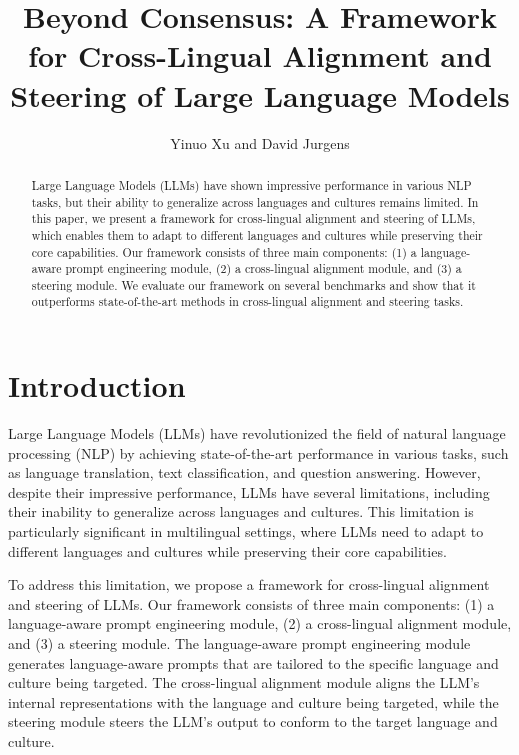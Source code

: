 \documentclass{article}
\begin{document}
\title{Beyond Consensus: A Framework for Cross-Lingual Alignment and Steering of Large Language Models}

\author{Yinuo Xu and David Jurgens}

\maketitle

\begin{abstract}
Large Language Models (LLMs) have shown impressive performance in various NLP tasks, but their ability to generalize across languages and cultures remains limited. In this paper, we present a framework for cross-lingual alignment and steering of LLMs, which enables them to adapt to different languages and cultures while preserving their core capabilities. Our framework consists of three main components: (1) a language-aware prompt engineering module, (2) a cross-lingual alignment module, and (3) a steering module. We evaluate our framework on several benchmarks and show that it outperforms state-of-the-art methods in cross-lingual alignment and steering tasks.

\end{abstract}

\section{Introduction}

Large Language Models (LLMs) have revolutionized the field of natural language processing (NLP) by achieving state-of-the-art performance in various tasks, such as language translation, text classification, and question answering. However, despite their impressive performance, LLMs have several limitations, including their inability to generalize across languages and cultures. This limitation is particularly significant in multilingual settings, where LLMs need to adapt to different languages and cultures while preserving their core capabilities.

To address this limitation, we propose a framework for cross-lingual alignment and steering of LLMs. Our framework consists of three main components: (1) a language-aware prompt engineering module, (2) a cross-lingual alignment module, and (3) a steering module. The language-aware prompt engineering module generates language-aware prompts that are tailored to the specific language and culture being targeted. The cross-lingual alignment module aligns the LLM's internal representations with the language and culture being targeted, while the steering module steers the LLM's output to conform to the target language and culture.
\end{document}
